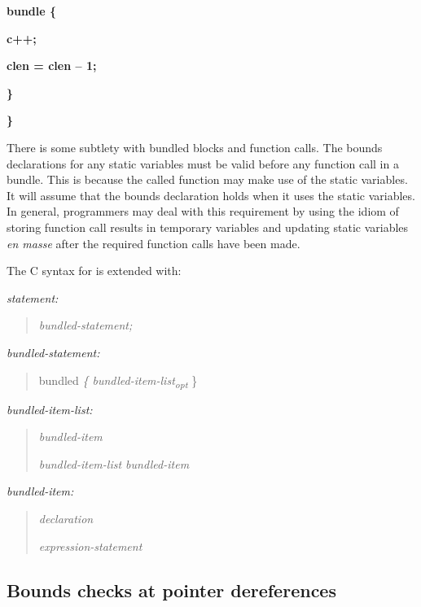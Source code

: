 \documentclass[]{article}
\begin{document}
\textbf{bundle \{}

\textbf{c++;}

\textbf{clen = clen -- 1;}

\textbf{\}}

\textbf{\}}

There is some subtlety with bundled blocks and function calls. The
bounds declarations for any static variables must be valid before any
function call in a bundle. This is because the called function may make
use of the static variables. It will assume that the bounds declaration
holds when it uses the static variables. In general, programmers may
deal with this requirement by using the idiom of storing function call
results in temporary variables and updating static variables \emph{en
masse} after the required function calls have been made.

The C syntax for is extended with:

\emph{statement:}

\begin{quote}
\emph{bundled-statement;}
\end{quote}

\emph{bundled-statement:}

\begin{quote}
bundled \emph{\{ bundled-item-list\textsubscript{opt}} \}
\end{quote}

\emph{bundled-item-list:}

\begin{quote}
\emph{bundled-item}

\emph{bundled-item-list bundled-item}
\end{quote}

\emph{bundled-item:}

\begin{quote}
\emph{declaration}

\emph{expression-statement}
\end{quote}

\subsection{\texorpdfstring{\protect\hypertarget{ux5fRef424292806}{}{\protect\hypertarget{ux5fToc424307699}{}{\protect\hypertarget{ux5fRef424742492}{}{\protect\hypertarget{ux5fToc426641080}{}{\protect\hypertarget{ux5fToc435434945}{}{\protect\hypertarget{ux5fToc437460771}{}{\protect\hypertarget{ux5fToc440445449}{}{\protect\hypertarget{ux5fToc440449231}{}{\protect\hypertarget{ux5fToc440551881}{}{}}}}}}}}}Bounds
checks at pointer
dereferences}{Bounds checks at pointer dereferences}}\label{bounds-checks-at-pointer-dereferences}
\end{document}
